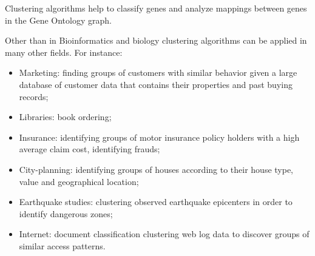 Clustering algorithms help to classify genes and analyze mappings between genes in the Gene Ontology graph. 


Other than in Bioinformatics and biology clustering algorithms can be applied in many other fields. For instance:

\begin{itemize}
\item Marketing: finding groups of customers with similar behavior given a large database of customer data that contains their properties and past buying records;
\item Libraries: book ordering;
\item Insurance: identifying groups of motor insurance policy holders with a high average claim cost, identifying frauds;
\item City-planning: identifying groups of houses according to their house type, value and geographical location;
\item Earthquake studies: clustering observed earthquake epicenters in order to identify dangerous zones;
\item Internet: document classification clustering web log data to discover groups of similar access patterns.
\end{itemize}